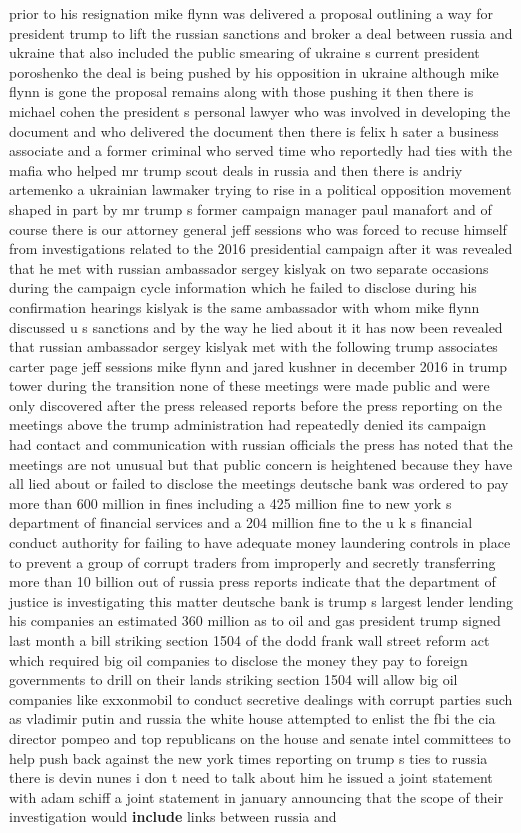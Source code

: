 \documentclass{article}
\begin{document}
prior to his resignation mike flynn was delivered a proposal outlining a way for president trump to lift the russian sanctions and broker a deal between russia and ukraine that also included the public smearing of ukraine s current president poroshenko the deal is being pushed by his opposition in ukraine although mike flynn is gone the proposal remains along with those pushing it then there is michael cohen the president s personal lawyer who was involved in developing the document and who delivered the document then there is felix h sater a business associate and a former criminal who served time who reportedly had ties with the mafia who helped mr trump scout deals in russia and then there is andriy artemenko a ukrainian lawmaker trying to rise in a political opposition movement shaped in part by mr trump s former campaign manager paul manafort and of course there is our attorney general jeff sessions who was forced to recuse himself from investigations related to the 2016 presidential campaign after it was revealed that he met with russian ambassador sergey kislyak on two separate occasions during the campaign cycle information which he failed to disclose during his confirmation hearings kislyak is the same ambassador with whom mike flynn discussed u s sanctions and by the way he lied about it it has now been revealed that russian ambassador sergey kislyak met with the following trump associates carter page jeff sessions mike flynn and jared kushner in december 2016 in trump tower during the transition none of these meetings were made public and were only discovered after the press released reports before the press reporting on the meetings above the trump administration had repeatedly denied its campaign had contact and communication with russian officials the press has noted that the meetings are not unusual but that public concern is heightened because they have all lied about or failed to disclose the meetings deutsche bank was ordered to pay more than 600 million in fines including a 425 million fine to new york s department of financial services and a 204 million fine to the u k s financial conduct authority for failing to have adequate money laundering controls in place to prevent a group of corrupt traders from improperly and secretly transferring more than 10 billion out of russia press reports indicate that the department of justice is investigating this matter deutsche bank is trump s largest lender lending his companies an estimated 360 million as to oil and gas president trump signed last month a bill striking section 1504 of the dodd frank wall street reform act which required big oil companies to disclose the money they pay to foreign governments to drill on their lands striking section 1504 will allow big oil companies like exxonmobil to conduct secretive dealings with corrupt parties such as vladimir putin and russia the white house attempted to enlist the fbi the cia director pompeo and top republicans on the house and senate intel committees to help push back against the new york times reporting on trump s ties to russia there is devin nunes i don t need to talk about him he issued a joint statement with adam schiff a joint statement in january announcing that the scope of their investigation would {\bf \color{red} include} links between russia and 
\end{document}
